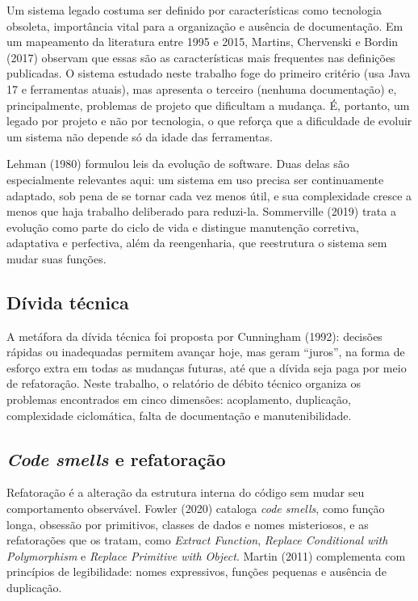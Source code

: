 \documentclass[12pt,a4paper]{article}
\begin{document}
Um sistema legado costuma ser definido por características como tecnologia obsoleta, importância vital para a organização e ausência de documentação. Em um mapeamento da literatura entre 1995 e 2015, Martins, Chervenski e Bordin (2017) observam que essas são as características mais frequentes nas definições publicadas. O sistema estudado neste trabalho foge do primeiro critério (usa Java 17 e ferramentas atuais), mas apresenta o terceiro (nenhuma documentação) e, principalmente, problemas de projeto que dificultam a mudança. É, portanto, um legado por projeto e não por tecnologia, o que reforça que a dificuldade de evoluir um sistema não depende só da idade das ferramentas.

Lehman (1980) formulou leis da evolução de software. Duas delas são especialmente relevantes aqui: um sistema em uso precisa ser continuamente adaptado, sob pena de se tornar cada vez menos útil, e sua complexidade cresce a menos que haja trabalho deliberado para reduzi-la. Sommerville (2019) trata a evolução como parte do ciclo de vida e distingue manutenção corretiva, adaptativa e perfectiva, além da reengenharia, que reestrutura o sistema sem mudar suas funções.

\subsection{Dívida técnica}

A metáfora da dívida técnica foi proposta por Cunningham (1992): decisões rápidas ou inadequadas permitem avançar hoje, mas geram ``juros'', na forma de esforço extra em todas as mudanças futuras, até que a dívida seja paga por meio de refatoração. Neste trabalho, o relatório de débito técnico organiza os problemas encontrados em cinco dimensões: acoplamento, duplicação, complexidade ciclomática, falta de documentação e manutenibilidade.

\subsection{\textit{Code smells} e refatoração}

Refatoração é a alteração da estrutura interna do código sem mudar seu comportamento observável. Fowler (2020) cataloga \textit{code smells}, como função longa, obsessão por primitivos, classes de dados e nomes misteriosos, e as refatorações que os tratam, como \textit{Extract Function}, \textit{Replace Conditional with Polymorphism} e \textit{Replace Primitive with Object}. Martin (2011) complementa com princípios de legibilidade: nomes expressivos, funções pequenas e ausência de duplicação.
\end{document}
